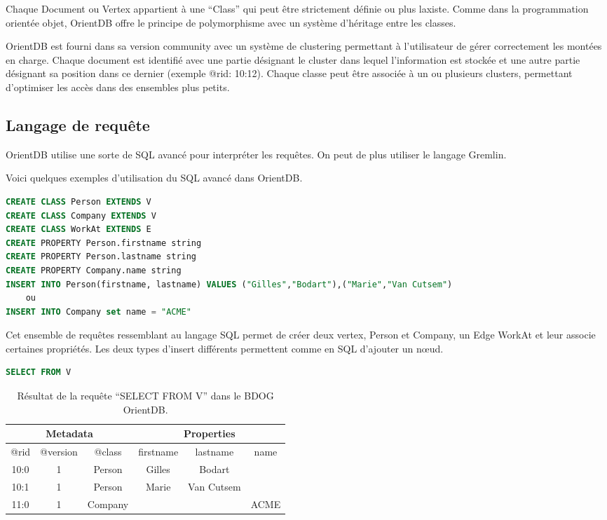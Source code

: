 \documentclass[a4paper,fleqn,12pt,oneside]{book}
\begin{document}
Chaque Document ou Vertex appartient à une \enquote{Class} qui peut être strictement définie ou plus laxiste. Comme dans la programmation orientée objet, OrientDB offre le principe de polymorphisme avec un système d'héritage entre les classes. 

OrientDB est fourni dans sa version community avec un système de clustering permettant à l'utilisateur de gérer correctement les montées en charge. Chaque document est identifié avec une partie désignant le cluster dans lequel l'information est stockée et une autre partie désignant sa position dans ce dernier (exemple @rid: 10:12). Chaque classe peut être associée à un ou plusieurs clusters, permettant d'optimiser les accès dans des ensembles plus petits.


\subsection{Langage de requête}

OrientDB utilise une sorte de SQL avancé pour interpréter les requêtes. On peut de plus utiliser le langage Gremlin.

Voici quelques exemples d'utilisation du SQL avancé dans OrientDB.

\begin{lstlisting}[language=SQL]
CREATE CLASS Person EXTENDS V
CREATE CLASS Company EXTENDS V
CREATE CLASS WorkAt EXTENDS E
CREATE PROPERTY Person.firstname string
CREATE PROPERTY Person.lastname string
CREATE PROPERTY Company.name string
INSERT INTO Person(firstname, lastname) VALUES ("Gilles","Bodart"),("Marie","Van Cutsem")
	ou
INSERT INTO Company set name = "ACME"

\end{lstlisting}

Cet ensemble de requêtes ressemblant au langage SQL permet de créer deux vertex, Person et Company, un Edge WorkAt et leur associe certaines propriétés. Les deux types d’insert différents permettent comme en SQL d’ajouter un nœud.

\begin{lstlisting}[language=SQL]
SELECT FROM V
\end{lstlisting}
\begin{table}
	\centering
	\begin{tabular}{|c|c|c|c|c|c|}
   		\hline
  		\multicolumn{3}{|c|}{Metadata} & \multicolumn{3}{c|}{Properties} \\
   		\hline
   		@rid & @version & @class & firstname & lastname & name \\
   		\hline
   		10:0 & 1 & Person & Gilles & Bodart &  \\
   		10:1 & 1 & Person & Marie & Van Cutsem &  \\
   		11:0 & 1 & Company &  &  & ACME \\
   		\hline
	\end{tabular}
	\caption{Résultat de la requête \enquote{SELECT FROM V} dans le BDOG OrientDB.}
\end{table}
\end{document}

